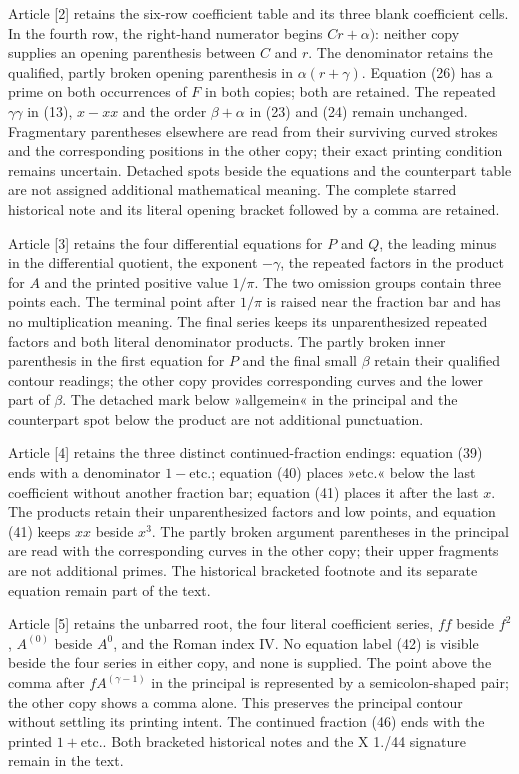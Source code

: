 \par Article [2] retains the six-row coefficient table and its three blank coefficient cells. In the fourth row, the right-hand numerator begins $Cr+\alpha)$: neither copy supplies an opening parenthesis between $C$ and $r$. The denominator retains the qualified, partly broken opening parenthesis in $\alpha(r+\gamma)$. Equation (26) has a prime on both occurrences of $F$ in both copies; both are retained. The repeated $\gamma\gamma$ in (13), $x-xx$ and the order $\beta+\alpha$ in (23) and (24) remain unchanged. Fragmentary parentheses elsewhere are read from their surviving curved strokes and the corresponding positions in the other copy; their exact printing condition remains uncertain. Detached spots beside the equations and the counterpart table are not assigned additional mathematical meaning. The complete starred historical note and its literal opening bracket followed by a comma are retained.

\par Article [3] retains the four differential equations for $P$ and $Q$, the leading minus in the differential quotient, the exponent $-\gamma$, the repeated factors in the product for $A$ and the printed positive value $1/\pi$. The two omission groups contain three points each. The terminal point after $1/\pi$ is raised near the fraction bar and has no multiplication meaning. The final series keeps its unparenthesized repeated factors and both literal denominator products. The partly broken inner parenthesis in the first equation for $P$ and the final small $\beta$ retain their qualified contour readings; the other copy provides corresponding curves and the lower part of $\beta$. The detached mark below »allgemein« in the principal and the counterpart spot below the product are not additional punctuation.

\par Article [4] retains the three distinct continued-fraction endings: equation (39) ends with a denominator $1-\mathrm{etc.}$; equation (40) places »etc.« below the last coefficient without another fraction bar; equation (41) places it after the last $x$. The products retain their unparenthesized factors and low points, and equation (41) keeps $xx$ beside $x^3$. The partly broken argument parentheses in the principal are read with the corresponding curves in the other copy; their upper fragments are not additional primes. The historical bracketed footnote and its separate equation remain part of the text.

\par Article [5] retains the unbarred root, the four literal coefficient series, $ff$ beside $f^2$, $A^{(0)}$ beside $A^0$, and the Roman index IV. No equation label (42) is visible beside the four series in either copy, and none is supplied. The point above the comma after $fA^{(\gamma-1)}$ in the principal is represented by a semicolon-shaped pair; the other copy shows a comma alone. This preserves the principal contour without settling its printing intent. The continued fraction (46) ends with the printed $1+\mathrm{etc.}$. Both bracketed historical notes and the X 1./44 signature remain in the text.

